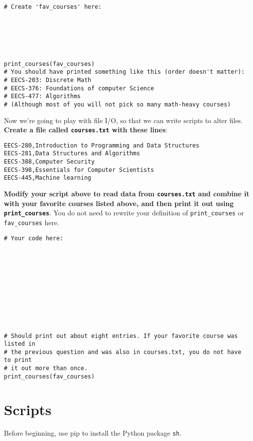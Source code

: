 \documentclass{article}
\begin{document}
\begin{enumerate}
\begin{minipage}{\textwidth}
\begin{lstlisting}[style=Python]
# Create 'fav_courses' here:






print_courses(fav_courses)
# You should have printed something like this (order doesn't matter):
# EECS-203: Discrete Math
# EECS-376: Foundations of computer Science
# EECS-477: Algorithms
# (Although most of you will not pick so many math-heavy courses)
  \end{lstlisting}
\end{minipage}

\begin{minipage}{\textwidth}
    \item Now we're going to play with file I/O, so that we can write scripts to alter files. \textbf{Create a file called \texttt{courses.txt} with these lines}:
    \begin{lstlisting}[style=Python]
EECS-280,Introduction to Programming and Data Structures
EECS-281,Data Structures and Algorithms
EECS-388,Computer Security
EECS-398,Essentials for Computer Scientists
EECS-445,Machine learning
    \end{lstlisting} 
    \textbf{Modify your script above to read data from \texttt{courses.txt} and combine it with your favorite courses listed above, and then print it out using \texttt{print\_courses}}. You do not need to rewrite your definition of \texttt{print\_courses} or \texttt{fav\_courses} here.
  \begin{lstlisting}[style=Python]
# Your code here:











# Should print out about eight entries. If your favorite course was listed in
# the previous question and was also in courses.txt, you do not have to print
# it out more than once.
print_courses(fav_courses)
  \end{lstlisting}
\end{minipage}
\end{enumerate}

\section{Scripts}
Before beginning, use pip to install the Python package \texttt{sh}.
\end{document}
